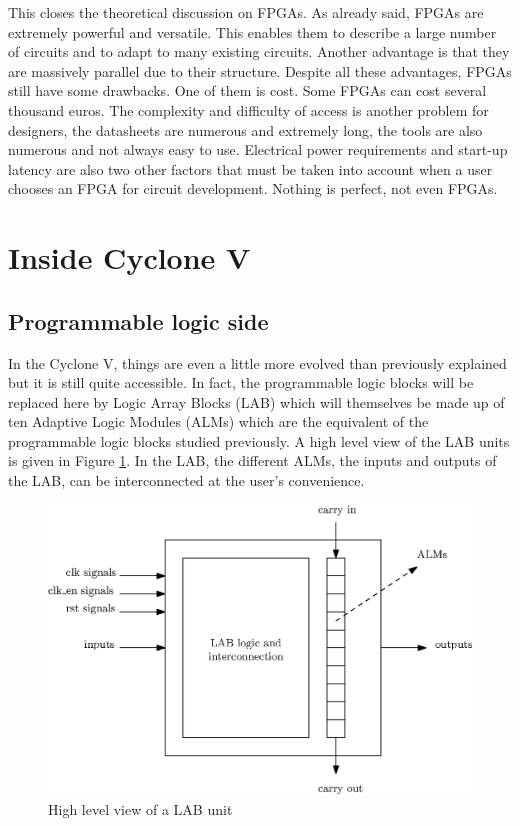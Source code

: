 This closes the theoretical discussion on FPGAs. As already said, FPGAs are extremely 
powerful and versatile. This enables them to describe a large number of circuits and to adapt to
many existing circuits. Another advantage is that they are massively parallel due to their 
structure. Despite all these 
advantages, FPGAs still have some drawbacks. One of them is cost. Some FPGAs can cost several 
thousand euros. The complexity and difficulty of access is another problem for designers, the 
datasheets are numerous and extremely long, the tools are also numerous and not always easy to use. 
Electrical power requirements and start-up latency are also two other factors that must be taken 
into account when a user chooses an FPGA for circuit development. Nothing is perfect, not even 
FPGAs.

\section{Inside Cyclone V}

\subsection{Programmable logic side}

In the Cyclone V, things are even a little more evolved than previously explained but it is still quite 
accessible. In fact, the programmable logic blocks will be replaced here by Logic Array Blocks (LAB) 
which will themselves be made up of ten Adaptive Logic Modules (ALMs) which are the equivalent of 
the programmable logic blocks studied previously. A high level view of the LAB units is given in
Figure \ref{fig:cyc5/lab}. In the LAB, the different ALMs, the inputs and outputs of the LAB, can be 
interconnected at the user's convenience.

\begin{figure}[H]
    \centering
    \includegraphics[scale=0.8]{Chapter1-Hardware/res/lab_block.eps}
    \caption{High level view of a LAB unit}
    \label{fig:cyc5/lab}
\end{figure}


